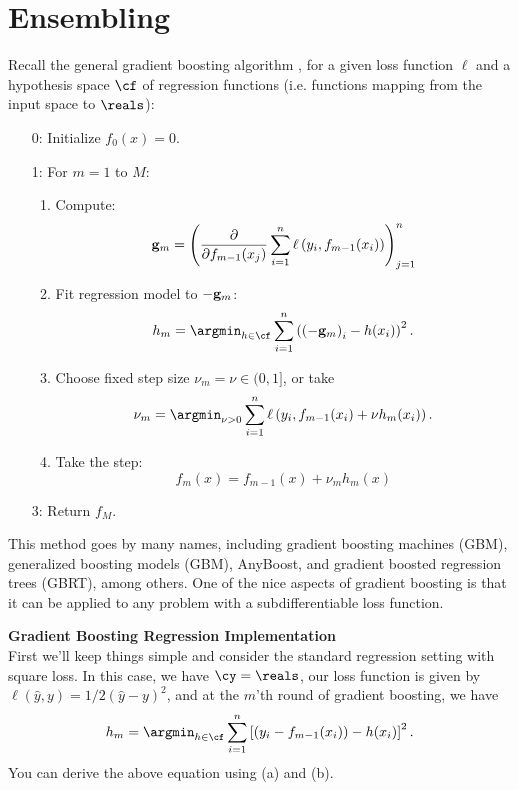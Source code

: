 \documentclass{article}
\newcommand{\nyuparagraph}[1]{\vspace{0.3cm}\textcolor{nyupurple}{\bf \large #1}\\}
\theoremstyle{plain}
\theoremstyle{definition}
\begin{document}
\section{Ensembling}

Recall the general gradient boosting algorithm
, for a given loss function $\ell$ and a hypothesis space $\cf$
of regression functions (i.e. functions mapping from the input space
to $\reals$): 
\begin{enumerate}
\setcounter{enumi}{\value{saveenum}}
\item[0:] Initialize $f_{0}(x)=0$. 
\item[1:] For $m=1$ to $M$:

\begin{enumerate}
\item Compute: 
\[
{\bf g}_{m}=\left( \frac{\partial}{\partial f_{m-1}(x_{j})}\sum_{i=1}^{n}\ell\left(y_{i},f_{m-1}(x_{i})\right)\right)_{j=1}^{n}
\]
\item Fit regression model to $-{\bf g}_{m}$: 
\[
h_{m}=\argmin_{h\in\cf}\sum_{i=1}^{n}\left(\left(-{\bf g}_{m}\right)_{i}-h(x_{i})\right)^{2}.
\]
\item Choose fixed step size $\nu_{m}=\nu\in(0,1]$, or take 
\[
\nu_{m}=\argmin_{\nu>0}\sum_{i=1}^{n}\ell\left(y_{i},f_{m-1}(x_{i})+\nu h_{m}(x_{i})\right).
\]
\item Take the step: 
\[
f_{m}(x)=f_{m-1}(x)+\nu_{m}h_{m}(x)
\]
\end{enumerate}
\item[3:] Return $f_{M}$. 
\end{enumerate}


This method goes by many names, including gradient boosting machines
(GBM), generalized boosting models (GBM), AnyBoost, and gradient boosted
regression trees (GBRT), among others. One of the nice aspects
of gradient boosting is that it can be applied to any problem with
a subdifferentiable loss function.

\nyuparagraph{Gradient Boosting Regression Implementation}
First we'll keep things simple and consider the standard regression setting with square loss. In this case, we have $\cy=\reals$, our
loss function is given by $
\ell(\hat{y},y)=1/2\left(\hat{y}-y\right)^{2}$,
and at the $m$'th round of gradient boosting, we
have
\[
h_{m}=\argmin_{h\in\cf}\sum_{i=1}^{n}\left[\left(y_{i}-f_{m-1}(x_{i})\right)-h(x_{i})\right]^{2}.
\]
You can derive the above equation using (a) and (b). 
\end{document}
